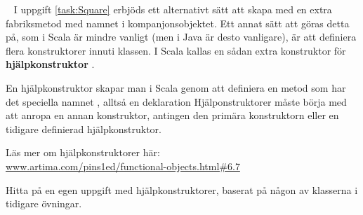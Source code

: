 \AdvancedTasks %

\TODO
\QUESTEND







\QUESTBEGIN

\Task \label{task:aux-constructor} \what~   I uppgift \ref{task:Square} erbjöds ett alternativt sätt att skapa  med en extra fabriksmetod med namnet  i kompanjonsobjektet. Ett annat sätt att göras detta på, som i Scala är mindre vanligt (men i Java är desto vanligare), är att definiera flera konstruktorer innuti klassen. I Scala kallas en sådan extra konstruktor för \textbf{hjälpkonstruktor} .

En hjälpkonstruktor skapar man i Scala genom att definiera en metod som har det speciella namnet , alltså en deklaration  Hjälponstruktorer måste börja med att anropa en annan konstruktor, antingen den primära konstruktorn eller en tidigare definierad  hjälpkonstruktor.

\Subtask Läs mer om hjälpkonstruktorer här: \\ \href{http://www.artima.com/pins1ed/functional-objects.html#6.7}{www.artima.com/pins1ed/functional-objects.html\#6.7}

\Subtask Hitta på en egen uppgift med hjälpkonstruktorer, baserat på någon av klasserna i tidigare övningar.




\QUESTEND
